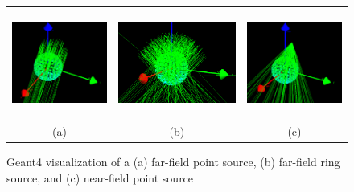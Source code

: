 \documentclass[10pt]{article}
\begin{document}
\begin{figure}[htb!]
\hypertarget{fig2}{}
\centering
\begin{tabular}{ccc}
	\includegraphics[height=100pt]{Figures/FarFieldVis.png} & 
	\includegraphics[height=100pt]{Figures/FarFieldRingVis.png} & 
	\includegraphics[height=100pt]{Figures/NearFieldVis.png} \\ [-0.5ex]
	\scriptsize{(a)} & \scriptsize{(b)} & \scriptsize{(c)}
\end{tabular}
\caption{Geant4 visualization of a (a) far-field point source, (b) far-field ring source, and (c) near-field point source}
\end{figure}
\end{document}
